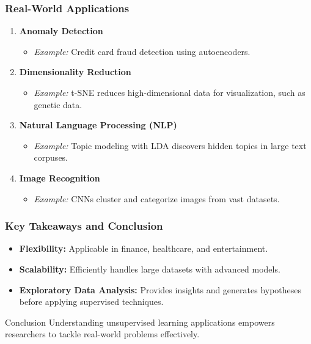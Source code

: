 \documentclass[aspectratio=169]{beamer}
\begin{document}
\begin{frame}[fragile]
    \frametitle{Real-World Applications}
    \begin{enumerate}
        \item \textbf{Anomaly Detection}
            \begin{itemize}
                \item \textit{Example:} Credit card fraud detection using autoencoders.
            \end{itemize}
            
        \item \textbf{Dimensionality Reduction}
            \begin{itemize}
                \item \textit{Example:} t-SNE reduces high-dimensional data for visualization, such as genetic data.
            \end{itemize}
            
        \item \textbf{Natural Language Processing (NLP)}
            \begin{itemize}
                \item \textit{Example:} Topic modeling with LDA discovers hidden topics in large text corpuses.
            \end{itemize}
            
        \item \textbf{Image Recognition}
            \begin{itemize}
                \item \textit{Example:} CNNs cluster and categorize images from vast datasets.
            \end{itemize}
    \end{enumerate}
\end{frame}

\begin{frame}[fragile]
    \frametitle{Key Takeaways and Conclusion}
    \begin{itemize}
        \item \textbf{Flexibility:} Applicable in finance, healthcare, and entertainment.
        \item \textbf{Scalability:} Efficiently handles large datasets with advanced models.
        \item \textbf{Exploratory Data Analysis:} Provides insights and generates hypotheses before applying supervised techniques.
    \end{itemize}
    
    \begin{block}{Conclusion}
        Understanding unsupervised learning applications empowers researchers to tackle real-world problems effectively.
    \end{block}
\end{frame}
\end{document}
